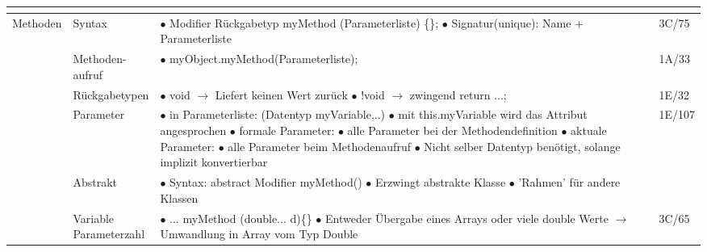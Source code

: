 \documentclass[11pt,a4paper]{article}
\begin{document}
\begin{center}
\begin{longtable}[h]{ | p{2.3cm} | p{2.3cm} | p{12.6cm} | p{1.2cm} | }
	
	
	\multicolumn{3}{c}{} \\ 
	\hline 
	
	
    
	{\large Methoden} & Syntax & \makecell[l]{$\bullet$ Modifier Rückgabetyp myMethod (Parameterliste) \{\}; \\ 
 	$\bullet$ Signatur(unique): Name + Parameterliste } & 3C/75 \\ \cline{2-4}  
 	
	& \makecell[l]{Methoden-\\aufruf} & $\bullet$ myObject.myMethod(Parameterliste); & 1A/33 \\ \cline{2-4}
	
	& Rückgabetypen & \makecell[l]{$\bullet$ void $\rightarrow$ Liefert keinen Wert zurück \\ 
	$\bullet$ !void $\rightarrow$ zwingend return ...;}& 1E/32 \\ \cline{2-4}
	
	& Parameter & \makecell[l]{$\bullet$ in Parameterliste: (Datentyp myVariable,..) \\ 
	$\bullet$ mit this.myVariable wird das Attribut angesprochen \\ 
	$\bullet$ formale Parameter: \\ \hspace{0.4cm} $\bullet$ alle Parameter bei der Methodendefinition \\ 
	$\bullet$ aktuale Parameter: \\ 
	\hspace{0,4cm} $\bullet$ alle Parameter beim Methodenaufruf \\ 
	\hspace{0.4cm} $\bullet$ Nicht selber Datentyp benötigt, solange implizit konvertierbar} & 1E/107 \\ \cline{2-4}
	
	& Abstrakt & \makecell[l]{$\bullet$ Syntax: abstract Modifier myMethod() \\ $\bullet$ Erzwingt abstrakte Klasse \\ 
	$\bullet$ 'Rahmen' für andere Klassen} &  \\ \cline{2-4}
	& \makecell[l]{Variable \\ Parameterzahl}& \makecell[l]{$\bullet$ ... myMethod (double... d)\{\} \\ 
	$\bullet$ Entweder Übergabe eines Arrays oder viele double Werte \\ 
	\hspace{0.4cm} $\rightarrow$ Umwandlung in Array vom Typ Double }  & 3C/65 \\ \cline{2-4}
	

\end{longtable}
\end{center}
\end{document}
